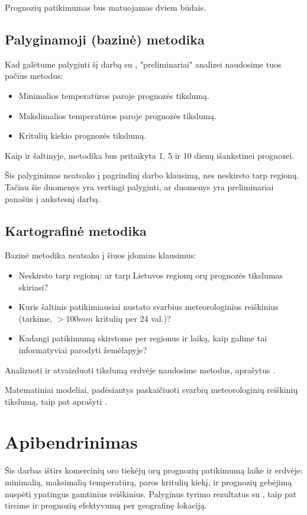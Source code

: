 \documentclass{article}
\begin{document}
Prognozių patikimumas bus matuojamas dviem būdais.

\subsection{Palyginamoji (bazinė) metodika}

Kad galėtume palyginti šį darbą su \cite{rose2017analysis}, "preliminariai"
analizei naudosime tuos pačius metodus:

\begin{itemize}
    \item Minimalios temperatūros paroje prognozės tikslumą.
    \item Makslimalios temperatūros paroje prognozės tikslumą.
    \item Kritulių kiekio prognozės tikslumą.
\end{itemize}

Kaip ir šaltinyje, metodika bus pritaikyta 1, 5 ir 10 dienų išankstinei
prognozei.

Šis palyginimas neatsako į pagrindinį darbo klausimą, nes neskirsto tarp
regionų. Tačiau šie duomenys yra vertingi palyginti, ar duomenys yra preliminariai
panašūs į ankstesnį darbą.

\subsection{Kartografinė metodika}

Bazinė metodika neatsako į šiuos įdomius klausimus:

\begin{itemize}
    \item Neskirsto tarp regionų: ar tarp Lietuvos regionų orų prognozės
        tikslumas skiriasi?
    \item Kuris šaltinis patikimiausiai nustato svarbius meteorologinius
        reiškinius (tarkime, $>100mm$ kritulių per 24 val.)?
    \item Kadangi patikimumą skirstome per regionus ir laiką, kaip galime tai
        informatyviai parodyti žemėlapyje?
\end{itemize}

Analizuoti ir atvaizduoti tikslumą erdvėje naudosime metodus, aprašytus
\cite{verification2015}.

Matematiniai modeliai, padėsiantys paskaičiuoti svarbių meteorologinių
reiškinių tikslumą, taip pat aprašyti \cite{verification2015}.

\section{Apibendrinimas}

Šis darbas ištirs komercinių oro tiekėjų orų prognozių patikimumą laike ir
erdvėje: minimalią, maksimalią temperatūrą, paros kritulių kiekį, ir prognozių
gebėjimą nuspėti ypatingus gamtinius reiškinius. Palyginus tyrimo rezultatus su
\cite{rose2017analysis}, taip pat tirsime ir prognozių efektyvumą per
geografinę lokaciją.

\printbibliography
\end{document}
